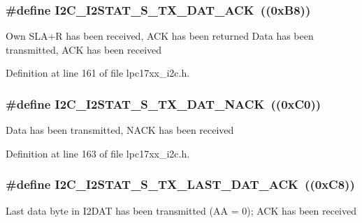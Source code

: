 \subsubsection[{\texorpdfstring{I2\+C\+\_\+\+I2\+S\+T\+A\+T\+\_\+\+S\+\_\+\+T\+X\+\_\+\+D\+A\+T\+\_\+\+A\+CK}{I2C_I2STAT_S_TX_DAT_ACK}}]{\setlength{\rightskip}{0pt plus 5cm}\#define I2\+C\+\_\+\+I2\+S\+T\+A\+T\+\_\+\+S\+\_\+\+T\+X\+\_\+\+D\+A\+T\+\_\+\+A\+CK~((0x\+B8))}\hypertarget{group___i2_c___private___macros_gaeb92fe85cc3f6c813cb91685234ac08c}{}\label{group___i2_c___private___macros_gaeb92fe85cc3f6c813cb91685234ac08c}
Own S\+L\+A+R has been received, A\+CK has been returned Data has been transmitted, A\+CK has been received 

Definition at line 161 of file lpc17xx\+\_\+i2c.\+h.

\subsubsection[{\texorpdfstring{I2\+C\+\_\+\+I2\+S\+T\+A\+T\+\_\+\+S\+\_\+\+T\+X\+\_\+\+D\+A\+T\+\_\+\+N\+A\+CK}{I2C_I2STAT_S_TX_DAT_NACK}}]{\setlength{\rightskip}{0pt plus 5cm}\#define I2\+C\+\_\+\+I2\+S\+T\+A\+T\+\_\+\+S\+\_\+\+T\+X\+\_\+\+D\+A\+T\+\_\+\+N\+A\+CK~((0x\+C0))}\hypertarget{group___i2_c___private___macros_gad9cdcd8c06924252a2ad9baced97d838}{}\label{group___i2_c___private___macros_gad9cdcd8c06924252a2ad9baced97d838}
Data has been transmitted, N\+A\+CK has been received 

Definition at line 163 of file lpc17xx\+\_\+i2c.\+h.

\subsubsection[{\texorpdfstring{I2\+C\+\_\+\+I2\+S\+T\+A\+T\+\_\+\+S\+\_\+\+T\+X\+\_\+\+L\+A\+S\+T\+\_\+\+D\+A\+T\+\_\+\+A\+CK}{I2C_I2STAT_S_TX_LAST_DAT_ACK}}]{\setlength{\rightskip}{0pt plus 5cm}\#define I2\+C\+\_\+\+I2\+S\+T\+A\+T\+\_\+\+S\+\_\+\+T\+X\+\_\+\+L\+A\+S\+T\+\_\+\+D\+A\+T\+\_\+\+A\+CK~((0x\+C8))}\hypertarget{group___i2_c___private___macros_ga3e4522387958da1da6017a6e48a0daad}{}\label{group___i2_c___private___macros_ga3e4522387958da1da6017a6e48a0daad}
Last data byte in I2\+D\+AT has been transmitted (AA = 0); A\+CK has been received 

